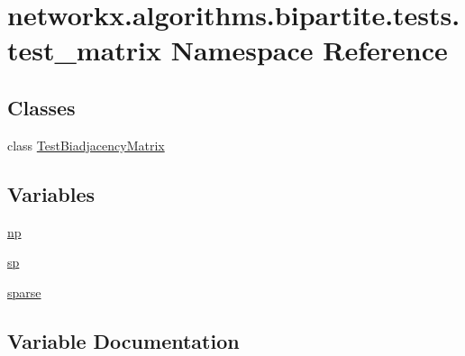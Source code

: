 \hypertarget{namespacenetworkx_1_1algorithms_1_1bipartite_1_1tests_1_1test__matrix}{}\section{networkx.\+algorithms.\+bipartite.\+tests.\+test\+\_\+matrix Namespace Reference}
\label{namespacenetworkx_1_1algorithms_1_1bipartite_1_1tests_1_1test__matrix}
\subsection*{Classes}
\begin{DoxyCompactItemize}
\item 
class \hyperlink{classnetworkx_1_1algorithms_1_1bipartite_1_1tests_1_1test__matrix_1_1TestBiadjacencyMatrix}{Test\+Biadjacency\+Matrix}
\end{DoxyCompactItemize}
\subsection*{Variables}
\begin{DoxyCompactItemize}
\item 
\hyperlink{namespacenetworkx_1_1algorithms_1_1bipartite_1_1tests_1_1test__matrix_ab14dcb0b017a096a2f5adbeb32d7cb7a}{np}
\item 
\hyperlink{namespacenetworkx_1_1algorithms_1_1bipartite_1_1tests_1_1test__matrix_ab9a171599bd2b01d025857ffc5123361}{sp}
\item 
\hyperlink{namespacenetworkx_1_1algorithms_1_1bipartite_1_1tests_1_1test__matrix_a1600c8342aa955de2f27404e29a4f947}{sparse}
\end{DoxyCompactItemize}


\subsection{Variable Documentation}
\mbox{\label{namespacenetworkx_1_1algorithms_1_1bipartite_1_1tests_1_1test__matrix_ab14dcb0b017a096a2f5adbeb32d7cb7a}} 
